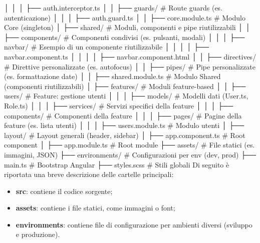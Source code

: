        │   │   │   ├── auth.interceptor.ts
        │   │   ├── guards/               # Route guards (es. autenticazione)
        │   │   │   ├── auth.guard.ts
        │   │   ├── core.module.ts        # Modulo Core (singleton)
        │   ├── shared/                   # Moduli, componenti e pipe riutilizzabili
        │   │   ├── components/           # Componenti condivisi (es. pulsanti, modali)
        │   │   │   ├── navbar/           # Esempio di un componente riutilizzabile
        │   │   │   │   ├── navbar.component.ts
        │   │   │   │   ├── navbar.component.html
        │   │   ├── directives/           # Direttive personalizzate (es. autofocus)
        │   │   ├── pipes/                # Pipe personalizzate (es. formattazione date)
        │   │   ├── shared.module.ts      # Modulo Shared (componenti riutilizzabili)
        │   ├── features/                 # Moduli feature-based
        │   │   ├── users/                # Feature: gestione utenti
        │   │   │   ├── models/           # Modelli dati (User.ts, Role.ts)
        │   │   │   ├── services/         # Servizi specifici della feature
        │   │   │   ├── components/       # Componenti della feature
        │   │   │   ├── pages/            # Pagine della feature (es. lista utenti)
        │   │   │   ├── users.module.ts   # Modulo utenti
        │   ├── layout/                   # Layout generali (header, sidebar)
        │   ├── app.component.ts          # Root component
        │   ├── app.module.ts             # Root module
        ├── assets/                       # File statici (es. immagini, JSON)
        ├── environments/                 # Configurazioni per env (dev, prod)
        ├── main.ts                        # Bootstrap Angular
        ├── styles.scss                    # Stili globali
\fi
{}
Di seguito è riportata una breve descrizione delle cartelle principali:
\begin{itemize}
    \item \textbf{src}: contiene il codice sorgente;
    \item \textbf{assets}: contiene i file statici, come immagini o font;
    \item \textbf{environments}: contiene file di configurazione per ambienti diversi (sviluppo e produzione).
\end{itemize}
